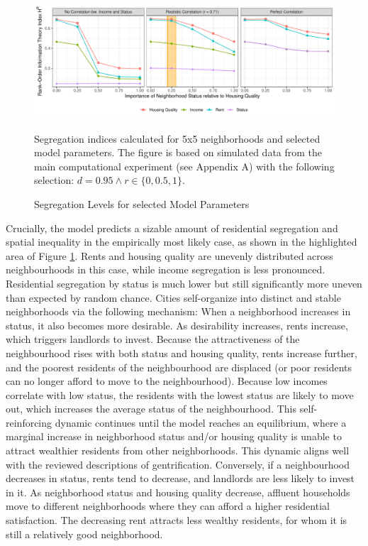 \documentclass[a4paper,12pt]{article}
\begin{document}
\begin{figure}
\caption{Segregation Levels for selected Model Parameters}
\includegraphics[width=\textwidth]{./images/abm_01_segregation}

\tiny{Segregation indices calculated for 5x5 neighborhoods and selected model parameters. The figure is based on simulated data from the main computational experiment (see Appendix A) with the following selection: $d = 0.95 \land r \in \{0, 0.5, 1\}$.} 
\label{fig:seg}
\end{figure}


Crucially, the model predicts a sizable amount of residential segregation and spatial inequality in the empirically most likely case, as shown in the highlighted area of Figure \ref{fig:seg}. Rents and housing quality are unevenly distributed across neighbourhoods in this case, while income segregation is less pronounced. Residential segregation by status is much lower but still significantly more uneven than expected by random chance. Cities self-organize into distinct and stable neighborhoods via the following mechanism: When a neighborhood increases in status, it also becomes more desirable. As desirability increases, rents increase, which triggers landlords to invest. Because the attractiveness of the neighbourhood rises with both status and housing quality, rents increase further, and the poorest residents of the neighbourhood are displaced (or poor residents can no longer afford to move to the neighbourhood). Because low incomes correlate with low status, the residents with the lowest status are likely to move out, which increases the average status of the neighbourhood. This self-reinforcing dynamic continues until the model reaches an equilibrium, where a marginal increase in neighborhood status and/or housing quality is unable to attract wealthier residents from other neighborhoods. This dynamic aligns well with the reviewed descriptions of gentrification. Conversely, if a neighbourhood decreases in status, rents tend to decrease, and landlords are less likely to invest in it. As neighborhood status and housing quality decrease, affluent households move to different neighborhoods where they can afford a higher residential satisfaction. The decreasing rent attracts less wealthy residents, for whom it is still a relatively good neighborhood. 
\end{document}
